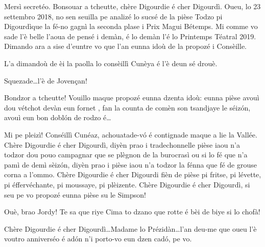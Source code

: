 \begin{drama}
\Presidanspeaks {} Mersì secretéo. Bonsouar a tcheutte, chère Digourdie é cher Digourdì. Oueu, lo 23 settembro 2018, no sen seuilla pe analizé lo sucsé de la pièse \og Todzo pi Digourdì\fg que la fé-no gagnì la seconda plase i Prix Magui Bétemps.
Mi comme vo sade l'è belle l’aoua de pensé i demàn, é lo demàn l’é lo Printemps Téatral 2019. Dimando ara a sise d'euntre vo que l'an eunna idoù de la propozé i Consèille.


\Presidanspeaks L’a dimandoù de èi la paolla lo consèillì Cunèya é l’è deun sé drouè.


\Cimaspeaks {} Squezade\ldots l'è de Jovençan!

\Richardspeaks Bondzor a tcheutte! Vouillo maque propozé eunna dzenta idoù: eunna pièse avouì dou vétchot devàn eun fornet \fornet, fan la counta de comèn son tsandjaye le séiz\'on, avouì eun bon dobl\'on de rodzo é\ldots

\Jordyspeaks {} Mi pe pleizì! Conséillì Cunéaz, achouatade-v\'o é contignade maque a lie la Vallée. Chère Digourdie é cher Digourdì, diyèn prao i tradechonnelle pièse iaou n'a todzor dou pouo campagnar que se plègnon de la burocrasì ou si lo fé que n'a pamì de demì sèiz\'on, diyèn prao i pièse iaou n'a todzor la fénna que fé de grouse corna a l'ommo. Chère Digourdie é cher Digourdi fièn de pièse pi fritse, pi lévette, pi éffervéchante, pi moussaye, pi plèizente. Chère Digourdie é cher Digourdì, si seu pe vo propozé eunna pièse su le Simpson\homer !

\Marcospeaks Ouè, brao Jordy! Te sa que riye Cima to dzano que rotte é bèi de biye si lo chofà!

\Dallasspeaks Chère Digourdie é cher Digourdì\ldots Madame lo Prézidàn\ldots l'an deu-me que oueu l'è voutro anniverséo é ad\'on n'i porto-vo eun dzen cad\'o, pe vo.


\end{drama}
